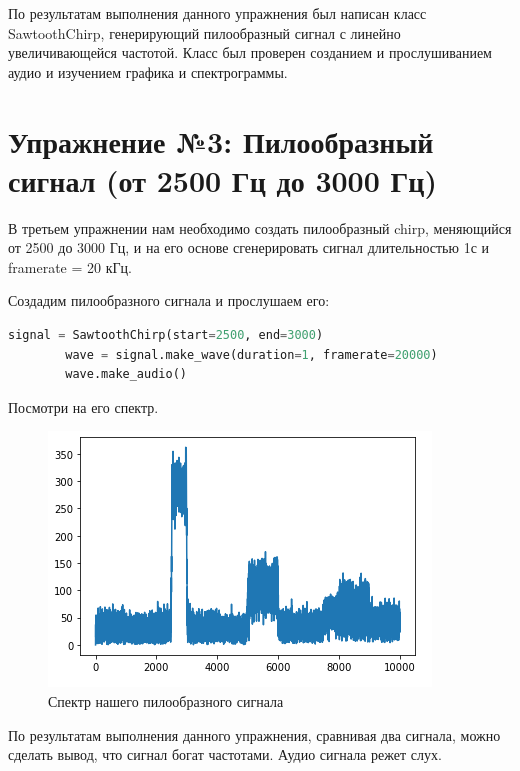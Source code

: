 \documentclass[a4paper, 14pt]{extarticle}
\begin{document}
    По результатам выполнения данного упражнения был написан класс SawtoothChirp, генерирующий пилообразный сигнал с линейно увеличивающейся частотой.
    Класс был проверен созданием и прослушиванием аудио и изучением графика и спектрограммы.

    \newpage


    \section{Упражнение №3: Пилообразный сигнал (от 2500 Гц до 3000 Гц)}
    \label{sec:3_sawtooth_signal_hz}

    В третьем упражнении нам необходимо создать пилообразный chirp, меняющийся от 2500 до 3000 Гц, и на его основе сгенерировать сигнал длительностью 1с и framerate = 20 кГц.

    Создадим пилообразного сигнала и прослушаем его:

    \begin{lstlisting}[language=Python, caption= Создание сигнала и создание аудио, label={lst:make_sawtooth_hz}]
        signal = SawtoothChirp(start=2500, end=3000)
        wave = signal.make_wave(duration=1, framerate=20000)
        wave.make_audio()
    \end{lstlisting}

    Посмотри на его спектр.

    \begin{figure}[H]
        \centering
        \includegraphics[width=0.8\linewidth]{sawtooth_hz_spectrum}
        \caption{Спектр нашего пилообразного сигнала}
        \label{fig:sawtooth_hz_spectrum}
    \end{figure}

    По результатам выполнения данного упражнения, сравнивая два сигнала, можно сделать вывод, что сигнал богат частотами.
    Аудио сигнала режет слух.
\end{document}
